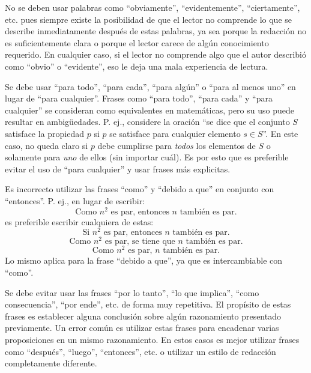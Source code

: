 No se deben usar palabras como ``obviamente'', ``evidentemente'', ``ciertamente'', etc. pues siempre existe la posibilidad de que el lector no comprende lo que se describe inmediatamente después de estas palabras, ya sea porque la redacción no es suficientemente clara o porque el lector carece de algún conocimiento requerido.
En cualquier caso, si el lector no comprende algo que el autor describió como ``obvio'' o ``evidente'', eso le deja una mala experiencia de lectura.

Se debe usar ``para todo'', ``para cada'', ``para algún'' o ``para al menos uno'' en lugar de ``para cualquier''.
Frases como ``para todo'', ``para cada'' y ``para cualquier'' se consideran como equivalentes en matemáticas, pero su uso puede resultar en ambigüedades.
P. ej., considere la oración ``se dice que el conjunto \(S\) satisface la propiedad \(p\) si \(p\) se satisface para cualquier elemento \(s\in S\)''.
En este caso, no queda claro si \(p\) debe cumplirse para \emph{todos} los elementos de \(S\) o solamente para \emph{uno} de ellos (sin importar cuál).
Es por esto que es preferible evitar el uso de ``para cualquier'' y usar frases más explicitas.

Es incorrecto utilizar las frases ``como'' y ``debido a que'' en conjunto con ``entonces''.
P. ej., en lugar de escribir:
\[
  \text{Como }n^{2}\text{ es par, entonces }n\text{ también es par.}
\]
es preferible escribir cualquiera de estas:
\[
  \text{Si }n^{2}\text{ es par, entonces }n\text{ también es par.}
\]
\[
  \text{Como }n^{2}\text{ es par, se tiene que }n\text{ también es par.}
\]
\[
  \text{Como }n^{2}\text{ es par, }n\text{ también es par.}
\]
Lo mismo aplica para la frase ``debido a que'', ya que es intercambiable con ``como''.

Se debe evitar usar las frases ``por lo tanto'', ``lo que implica'', ``como consecuencia'', ``por ende'', etc. de forma muy repetitiva.
El propísito de estas frases es establecer alguna conclusión sobre algún razonamiento presentado previamente.
Un error común es utilizar estas frases para encadenar varias proposiciones en un mismo razonamiento.
En estos casos es mejor utilizar frases como ``después'', ``luego'', ``entonces'', etc. o utilizar un estilo de redacción completamente diferente.


